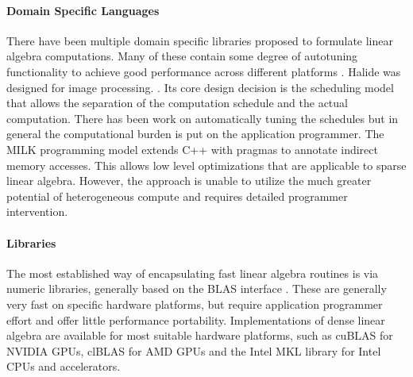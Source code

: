 \paragraph{Domain Specific Languages}
There have been multiple domain specific libraries proposed to formulate linear
algebra computations.
Many of these contain some degree of autotuning functionality to achieve good
performance across different platforms
\cite{Sujeeth:2014:DCA:2601432.2584665}.
Halide %
\cite{Ragan-Kelley:2013:HLC:2499370.2462176}
was designed for image processing.
\cite{Suriana:2017:PAR:3049832.3049863}.
Its core design decision is the scheduling model that allows the separation of
the computation schedule and the actual computation.
There has been work on automatically tuning the schedules
\cite{Mullapudi:2016:ASH:2897824.2925952} but in general the computational
burden is put on the application programmer.
The MILK programming model \cite{Kiriansky:2016:OIM:2967938.2967948} extends C++
with pragmas to annotate indirect memory accesses.
This allows low level optimizations that are applicable to sparse linear
algebra.
However, the approach is unable to utilize
the much greater potential of heterogeneous compute and requires detailed
programmer intervention.

\paragraph{Libraries}
The most established way of encapsulating fast linear algebra routines is via
numeric libraries, generally based on the BLAS interface
\cite{2002:USB:567806.567807}.
These are generally very fast on specific hardware platforms, but require
application programmer effort and offer little performance portability.
Implementations of dense linear algebra are available for most suitable hardware
platforms, such as cuBLAS \cite{cublas} for NVIDIA GPUs, clBLAS \cite{clblas}
for AMD GPUs and the Intel MKL library \cite{mkl} for Intel CPUs and
accelerators.

